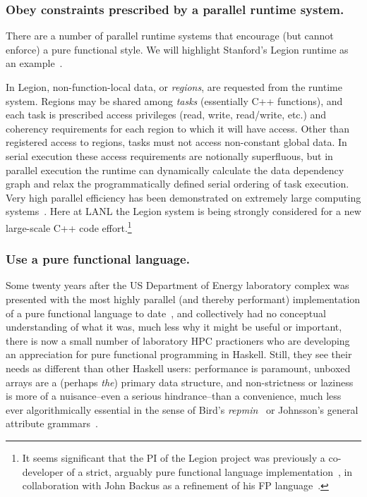 \documentclass{llncs}
\begin{document}
\subsubsection{Obey constraints prescribed by a parallel runtime system.}
There are a number of parallel runtime systems that encourage (but cannot
enforce) a pure functional style.  We will highlight Stanford's Legion
runtime as an example~\cite{Bauer12}.

In Legion, non-function-local data, or \emph{regions}, are requested from the
runtime system.  Regions may be shared among \emph{tasks} (essentially C++
functions), and each task is prescribed access privileges (read, write,
read/write, etc.)  and coherency requirements for each region to which it will
have access.  Other than registered access to regions, tasks must not access
non-constant global data.  In serial execution these access requirements are
notionally superfluous, but in parallel execution the runtime can dynamically
calculate the data dependency graph and relax the programmatically defined
serial ordering of task execution.  Very high parallel efficiency has been
demonstrated on extremely large computing systems~\cite{Bauer14}.  Here at
LANL the Legion system is being strongly considered for a new large-scale C++
code effort.\footnote{It seems significant that the PI of the Legion
  project was previously a co-developer of a strict, arguably pure functional
  language implementation~\cite{AikenFL,FLreport89}, in collaboration with
John Backus as a refinement of his FP language~\cite{Backus:1978}.}

\subsubsection{Use a pure functional language.}
Some twenty years after the US Department of Energy laboratory complex was
presented with the most highly parallel (and thereby performant)
implementation of a pure functional language to date~\cite{Davis96}, and
collectively had no conceptual understanding of what it was, much less why it
might be useful or important, there is now a small number of laboratory HPC
practioners who are developing an appreciation for pure functional programming
in Haskell.  Still, they see their needs as different than other Haskell
users: performance is paramount, unboxed arrays are a (perhaps \emph{the})
primary data structure, and non-strictness or laziness is more of a
nuisance--even a serious hindrance--than a convenience, much less ever
algorithmically essential in the sense of Bird's \emph{repmin}~\cite{Bird84}
or Johnsson's general attribute grammars~\cite{Johnsson87}.
\end{document}
